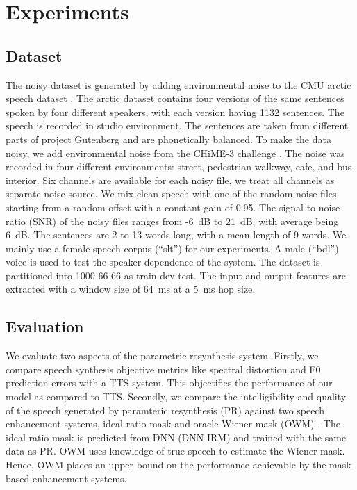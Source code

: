 \documentclass{article}
\begin{document}
\section{Experiments}
\label{sec:expr}
\subsection{Dataset}
\label{ssec:data}
The noisy dataset is generated by adding environmental noise to the CMU arctic speech dataset \cite{kominek2004cmu}. The arctic dataset contains four versions of the same sentences spoken by four different speakers, with each version having 1132 sentences. The speech is recorded in studio environment. The sentences are taken from different parts of project Gutenberg and are phonetically balanced. To make the data noisy, we add environmental noise from the CHiME-3 challenge \cite{BarkerthirdCHiMEspeech2015}. The noise was recorded in four different environments: street, pedestrian walkway, cafe, and bus interior. Six channels are available for each noisy file, we treat all channels as separate noise source. We mix clean speech with one of the random noise files starting from a random offset with a constant gain of 0.95. The signal-to-noise ratio (SNR) of the noisy files ranges from -6~dB to 21~dB, with average being 6~dB. The sentences are 2 to 13 words long, with a mean length of 9 words. We mainly use a female speech corpus (``slt'') for our experiments. A male (``bdl'') voice is used to test the speaker-dependence of the system. The dataset is partitioned into 1000-66-66 as train-dev-test. 
%
The input and output features are extracted with a window size of 64~ms at a 5~ms hop size. 

\subsection{Evaluation}
\label{ssec:eval}
We evaluate two aspects of the parametric resynthesis system.
Firstly, we compare speech synthesis objective metrics like spectral distortion and F0 prediction errors with a TTS system. This objectifies the performance of our model as compared to TTS. Secondly, we compare the intelligibility and quality of the speech generated by paramteric resynthesis (PR) against two speech enhancement systems, ideal-ratio mask and oracle Wiener mask (OWM) \cite{lim1979enhancement,scalart1996speech}. The ideal ratio mask is predicted from DNN (DNN-IRM) \cite{WangTrainingTargetsSupervised2014} and trained with the same data as PR. OWM uses knowledge of true speech to estimate the Wiener mask. Hence, OWM places an upper bound on the performance achievable by the mask based enhancement systems. 
\end{document}

